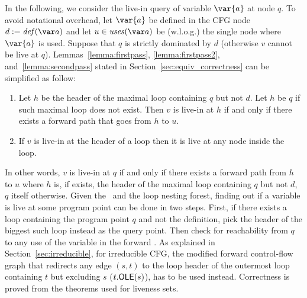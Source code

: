 In the following, we consider the live-in query of variable $\var{a}$ at node $q$.
To avoid notational overhead, let $\var{a}$ be defined in the CFG node $d:=\ldef{a}$ and let $u \in \luse{a}$ be (w.l.o.g.) the single node where $\var{a}$ is used.
Suppose that $q$ is strictly dominated by $d$ (otherwise $v$ cannot be live at $q$).
Lemmas~\ref{lemma:firstpass}, \ref{lemma:firstpass2}, and~\ref{lemma:secondpass} stated in Section~\ref{sec:equiv_correctness} can be simplified as follow:
\begin{enumerate}
\item
	Let $h$ be the header of the maximal loop containing $q$ but not $d$.
	Let $h$ be $q$ if such maximal loop does not exist.
	Then $v$ is live-in at $h$ if and only if there exists a forward path that goes from $h$ to $u$.
\item
	If $v$ is live-in at the header of a loop then it is live at any node inside the loop.
\end{enumerate}

In other words, $v$ is live-in at $q$ if and only if there exists a forward path from $h$ to $u$ where $h$ is, if exists, the header of the maximal loop containing $q$ but not $d$, $q$ itself otherwise.
Given the \reducedGraph\ and the loop nesting forest, finding out if a variable is live at some program point can be done in two steps.
First, if there exists a loop containing the program point $q$ and not the definition, pick the header of the biggest such loop instead as the query point.
Then check for reachability from $q$ to any use of the variable in the forward \@CFG.
As explained in Section~\ref{sec:irreducible}, for irreducible CFG, the modified forward control-flow graph that redirects any edge $(s,t)$ to the loop header of the outermost loop containing $t$ but excluding $s$ ($t.\textsf{OLE}(s)$), has to be used instead.
Correctness is proved from the theorems used for liveness sets.

\newcommand{\BB}[1]{\textsf{basicBlock}(#1)}
\newcommand{\ordering}[1]{\textsf{order}(#1)}
\newcommand{\isLoopHeader}[1]{\textsf{isLoopHeader}(#1)}
\newcommand{\FR}[2]{\textsf{{\reduced}Reachable}(#1,#2)}

